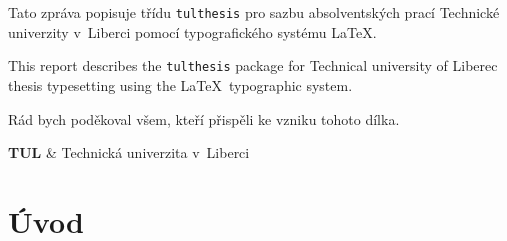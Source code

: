 \documentclass[FP,DP]{tulthesis}
\begin{document}

\begin{abstractCZ}
Tato zpráva popisuje třídu \texttt{tulthesis} pro sazbu absolventských prací
Technické univerzity v~Liberci pomocí typografického systému \LaTeX.
\end{abstractCZ}

\vspace{2cm}

\begin{abstractEN}
This report describes the \texttt{tulthesis} package for Technical university of
Liberec thesis typesetting using the \LaTeX\ typographic system.
\end{abstractEN}

\clearpage

\begin{acknowledgement}
Rád bych poděkoval všem, kteří přispěli ke vzniku tohoto dílka.
\end{acknowledgement}

\tableofcontents

\clearpage

\begin{abbrList}
\textbf{TUL} & Technická univerzita v~Liberci \\
\end{abbrList}

\chapter{Úvod}
\end{document}
